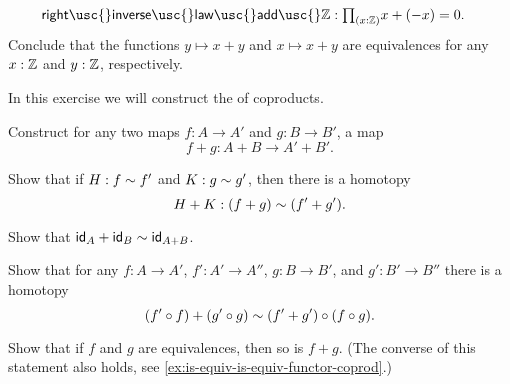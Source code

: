 \begin{exercises}
\begin{subexenum}
\begin{align*}
      \mathsf{right\usc{}inverse\usc{}law\usc{}add\usc{}}\Z & : \prd{x : \Z} x + (-x)=0.
    \end{align*}
    Conclude that the functions $y \mapsto x + y$ and $x\mapsto x + y$ are equivalences for any $x:\Z$ and $y:\Z$, respectively.
  \end{subexenum}
\item \label{ex:coproduct_functor}In this exercise we will construct the  of coproducts.
  \begin{subexenum}
  \item Construct for any two maps $f:A \to A'$ and $g:B \to B'$, a map
    \begin{equation*}
      f+g:A+B \to A'+B'.
    \end{equation*}
  \item Show that if $H:f\htpy f'$ and $K:g\htpy g'$, then there is a homotopy
    \begin{equation*}
      H+K:(f+g)\htpy (f'+g').
    \end{equation*}
  \item Show that $\idfunc[A]+\idfunc[B]\htpy \idfunc[A+B]$.
  \item Show that for any $f:A\to A'$, $f':A'\to A''$, $g:B\to B'$, and $g':B'\to B''$ there is a homotopy
    \begin{equation*}
      (f'\circ f)+(g'\circ g) \htpy (f'+g')\circ (f\circ g).
    \end{equation*}
  \item \label{ex:coproduct_functor_equivalence}Show that if $f$ and $g$ are equivalences, then so is $f+g$. (The converse of this statement also holds, see \cref{ex:is-equiv-is-equiv-functor-coprod}.)
  \end{subexenum}
\end{exercises}
